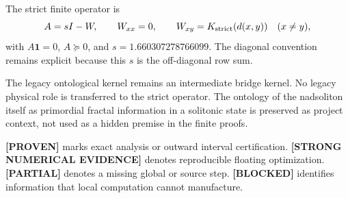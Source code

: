 \documentclass[11pt,a4paper]{article}
\newcommand{\Proven}{\textcolor{proved}{\textbf{[PROVEN]}}}
\newcommand{\Evidence}{\textcolor{conditional}{\textbf{[STRONG NUMERICAL EVIDENCE]}}}
\newcommand{\Partial}{\textcolor{conditional}{\textbf{[PARTIAL]}}}
\newcommand{\Blocked}{\textcolor{blocked}{\textbf{[BLOCKED]}}}
\begin{document}
The strict finite operator is
\[
A=sI-W,\qquad W_{xx}=0,\qquad
W_{xy}=K_{\rm strict}(d(x,y))\quad(x\ne y),
\]
with $A\mathbf1=0$, $A\succeq0$, and
$s=1.660307278766099$. The diagonal convention remains explicit because this $s$ is the
off-diagonal row sum.

The legacy ontological kernel remains an intermediate bridge kernel. No legacy physical
role is transferred to the strict operator. The ontology of the nadsoliton itself as
primordial fractal information in a solitonic state is preserved as project context, not
used as a hidden premise in the finite proofs.

\Proven{} marks exact analysis or outward interval certification. \Evidence{} denotes
reproducible floating optimization. \Partial{} denotes a missing global or source step.
\Blocked{} identifies information that local computation cannot manufacture.
\end{document}
